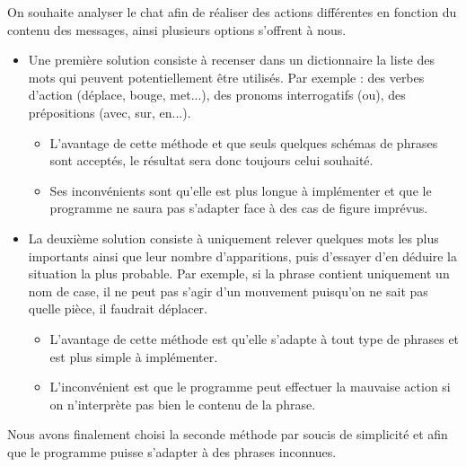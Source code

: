\documentclass[12pt, openany]{report}
\begin{document}
On souhaite analyser le chat afin de réaliser des actions différentes en fonction du contenu des messages, ainsi plusieurs options s'offrent à nous.
\begin{itemize}
    \item Une première solution consiste à recenser dans un dictionnaire la liste des mots qui peuvent potentiellement être utilisés. Par exemple : des verbes d'action (déplace, bouge, met...), des pronoms interrogatifs (ou), des prépositions (avec, sur, en...). 
    \begin{itemize}
        \item  L'avantage de cette méthode et que seuls quelques schémas de phrases sont acceptés, le résultat sera donc toujours celui souhaité.
        \item  Ses inconvénients sont qu'elle est plus longue à implémenter et que le programme ne saura pas s'adapter face à des cas de figure imprévus.
    \end{itemize}
    \item La deuxième solution consiste à uniquement relever quelques mots les plus importants ainsi que leur nombre d'apparitions, puis d'essayer d'en déduire la situation la plus probable. Par exemple, si la phrase contient uniquement un nom de case, il ne peut pas s'agir d'un mouvement puisqu'on ne sait pas quelle pièce, il faudrait déplacer. 
    \begin{itemize}
        \item L'avantage de cette méthode est qu'elle s'adapte à tout type de phrases et est plus simple à implémenter.
        \item L'inconvénient est que le programme peut effectuer la mauvaise action si on n'interprète pas bien le contenu de la phrase.
    \end{itemize}
\end{itemize}
Nous avons finalement choisi la seconde méthode par soucis de simplicité et afin que le programme puisse s'adapter à des phrases inconnues.
\end{document}
